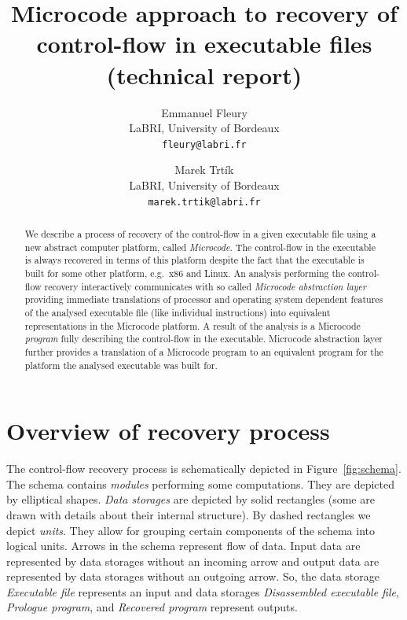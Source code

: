 \documentclass[10pt,twocolumn]{article}
\title{
Microcode approach to recovery of control-flow in executable files\\
{\large(technical report)}
}
\date{}
\author{
Emmanuel Fleury\\
LaBRI, University of Bordeaux\\
\texttt{fleury@labri.fr}
\and
Marek Trt\'{i}k\\
LaBRI, University of Bordeaux\\
\texttt{marek.trtik@labri.fr}
}
\begin{document}
\maketitle

\begin{abstract}
We describe a process of recovery of the control-flow in a given executable file
using a new abstract computer platform, called \emph{Microcode}. The
control-flow in the executable is always recovered in terms of this platform
despite the fact that the executable is built for some other platform, e.g.~x86
and Linux. An analysis performing the control-flow recovery interactively
communicates with so called \emph{Microcode abstraction layer} providing
immediate translations of processor and operating system dependent features of
the analysed executable file (like individual instructions) into equivalent
representations in the Microcode platform. A result of the analysis is a
Microcode \emph{program} fully describing the control-flow in the executable.
Microcode abstraction layer further provides a translation of a Microcode
program to an equivalent program for the platform the analysed executable was
built for.
\end{abstract}

\section{Overview of recovery process}
\label{sec:overview}

The control-flow recovery process is schematically depicted in
Figure~\ref{fig:schema}. The schema contains \emph{modules} performing some
computations. They are depicted by elliptical shapes. \emph{Data storages} are
depicted by solid rectangles (some are drawn with details about their internal
structure). By dashed rectangles we depict \emph{units}. They allow for
grouping certain components of the schema into logical units. Arrows in the
schema represent flow of data. Input data are represented by data storages
without an incoming arrow and output data are represented by data storages
without an outgoing arrow. So, the data storage \emph{Executable file}
represents an input and data storages \emph{Disassembled executable file},
\emph{Prologue program}, and \emph{Recovered program} represent outputs.
\end{document}
